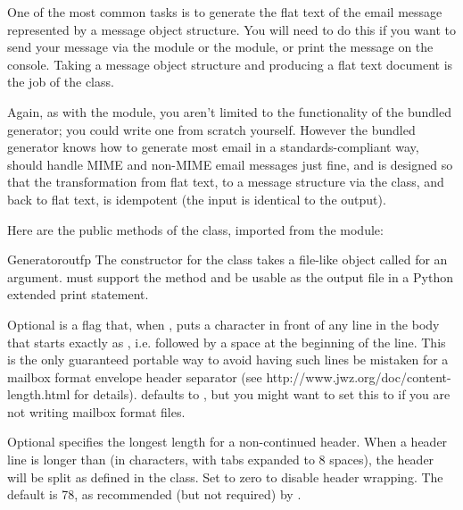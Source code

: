 
One of the most common tasks is to generate the flat text of the email
message represented by a message object structure.  You will need to do
this if you want to send your message via the 
module or the  module, or print the message on the
console.  Taking a message object structure and producing a flat text
document is the job of the  class.

Again, as with the  module, you aren't limited
to the functionality of the bundled generator; you could write one
from scratch yourself.  However the bundled generator knows how to
generate most email in a standards-compliant way, should handle MIME
and non-MIME email messages just fine, and is designed so that the
transformation from flat text, to a message structure via the
 class, and back to flat text, is idempotent (the input
is identical to the output).

Here are the public methods of the  class, imported from the
 module:

\begin{classdesc}{Generator}{outfp}
The constructor for the  class takes a file-like
object called  for an argument.   must support
the  method and be usable as the output file in a
Python extended print statement.

Optional  is a flag that, when , puts a
\samp{>} character in front of any line in the body that starts exactly as
, i.e.  followed by a space at the beginning of the
line.  This is the only guaranteed portable way to avoid having such
lines be mistaken for a \UNIX{} mailbox format envelope header separator (see
{http://www.jwz.org/doc/content-length.html}
for details).   defaults to , but you
might want to set this to  if you are not writing \UNIX{}
mailbox format files.

Optional  specifies the longest length for a
non-continued header.  When a header line is longer than
 (in characters, with tabs expanded to 8 spaces),
the header will be split as defined in the 
class.  Set to zero to disable header wrapping.  The default is 78, as
recommended (but not required) by .
\end{classdesc}

